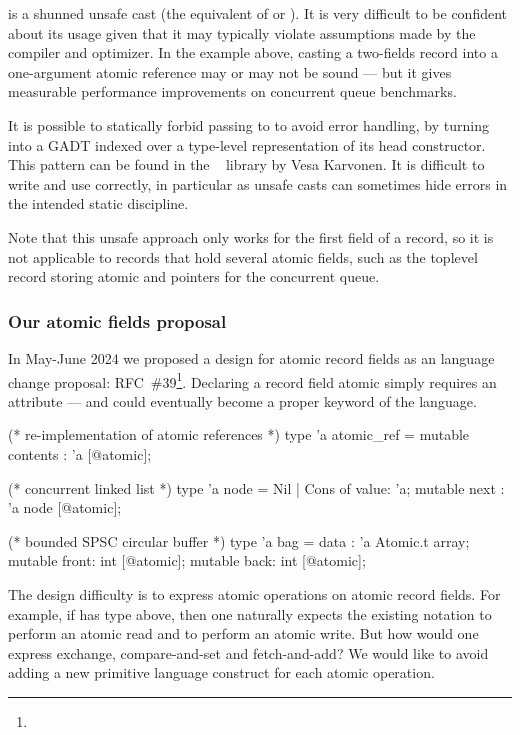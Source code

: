  is a shunned unsafe cast (the \OCaml equivalent of  or ).
It is very difficult to be confident about its usage given that it may typically violate assumptions made by the \OCaml compiler and optimizer.
In the example above, casting a two-fields record into a one-argument atomic reference may or may not be sound --- but it gives measurable performance improvements on concurrent queue benchmarks.

It is possible to statically forbid passing  to  to avoid error handling, by turning  into a GADT indexed over a type-level representation of its head constructor.
This pattern can be found in the \Kcas~\cite{kcas} library by Vesa Karvonen.
It is difficult to write and use correctly, in particular as unsafe casts can sometimes hide errors in the intended static discipline.

Note that this unsafe approach only works for the first field of a record, so it is not applicable to records that hold several atomic fields, such as the toplevel record storing atomic  and  pointers for the concurrent queue.

\subsubsection{Our atomic fields proposal}

In May-June 2024 we proposed a design for atomic record fields as an \OCaml language change proposal: RFC~\#39\footnote{}.
Declaring a record field atomic simply requires an \ocamlinline{[@atomic]} attribute --- and could eventually become a proper keyword of the language.

\begin{ocamlcode}
(* re-implementation of atomic references *)
type 'a atomic_ref = { mutable contents : 'a [@atomic]; }

(* concurrent linked list *)
type 'a node = Nil | Cons of { value: 'a; mutable next : 'a node [@atomic]; }

(* bounded SPSC circular buffer *)
type 'a bag = { data : 'a Atomic.t array;
                mutable front: int [@atomic];
                mutable back: int [@atomic]; }
\end{ocamlcode}

The design difficulty is to express atomic operations on atomic record fields.
For example, if  has type  above, then one naturally expects the existing notation  to perform an atomic read and  to perform an atomic write.
But how would one express exchange, compare-and-set and fetch-and-add?
We would like to avoid adding a new primitive language construct for each atomic operation.

